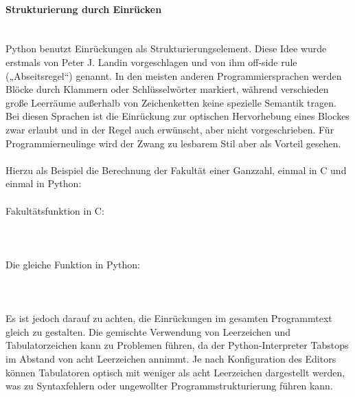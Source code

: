 \paragraph{Strukturierung durch Einrücken}\ \\
Python benutzt Einrückungen als Strukturierungselement. Diese Idee wurde erstmals von Peter J. Landin vorgeschlagen und von ihm off-side rule („Abseitsregel“) genannt. In den meisten anderen Programmiersprachen werden Blöcke durch Klammern oder Schlüsselwörter markiert, während verschieden große Leerräume außerhalb von Zeichenketten keine spezielle Semantik tragen. Bei diesen Sprachen ist die Einrückung zur optischen Hervorhebung eines Blockes zwar erlaubt und in der Regel auch erwünscht, aber nicht vorgeschrieben. Für Programmierneulinge wird der Zwang zu lesbarem Stil aber als Vorteil gesehen.\\
\\
Hierzu als Beispiel die Berechnung der Fakultät einer Ganzzahl, einmal in C und einmal in Python:\\
\\
Fakultätsfunktion in C:\\
\\
\\
\\
Die gleiche Funktion in Python:\\
\\
\\
\\
Es ist jedoch darauf zu achten, die Einrückungen im gesamten Programmtext gleich zu gestalten. Die gemischte Verwendung von Leerzeichen und Tabulatorzeichen kann zu Problemen führen, da der Python-Interpreter Tabstops im Abstand von acht Leerzeichen annimmt. Je nach Konfiguration des Editors können Tabulatoren optisch mit weniger als acht Leerzeichen dargestellt werden, was zu Syntaxfehlern oder ungewollter Programmstrukturierung führen kann.\\

